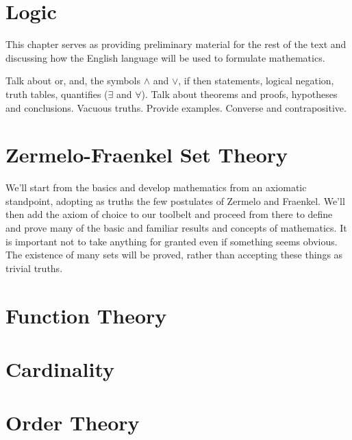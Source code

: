 \ifcsname\PATH\endcsname
    \newcommand{\PATH}{books/Foundations/ZFC}
\else
    \renewcommand{\PATH}{books/Foundations/ZFC}
\fi
\chapter{Logic}
    This chapter serves as providing preliminary material for the rest of
    the text and discussing how the English language will be used to formulate
    mathematics.
    \par\hfill\par
    Talk about or, and, the symbols $\land$ and $\lor$, if then statements,
    logical negation, truth tables, quantifies ($\exists$ and $\forall$).
    Talk about theorems and proofs, hypotheses and conclusions.
    Vacuous truths. Provide examples. Converse and contrapositive.
\chapter{Zermelo-Fraenkel Set Theory}
    We'll start from the basics and develop mathematics from an axiomatic
    standpoint, adopting as truths the few postulates of Zermelo and
    Fraenkel. We'll then add the axiom of choice to our toolbelt and
    proceed from there to define and prove many of the basic and familiar
    results and concepts of mathematics. It is important not to take anything
    for granted even if something seems obvious. The existence of many sets
    will be proved, rather than accepting these things as trivial truths.
    
    
\chapter{Function Theory}
    
    
\chapter{Cardinality}
    
\chapter{Order Theory}
    
    